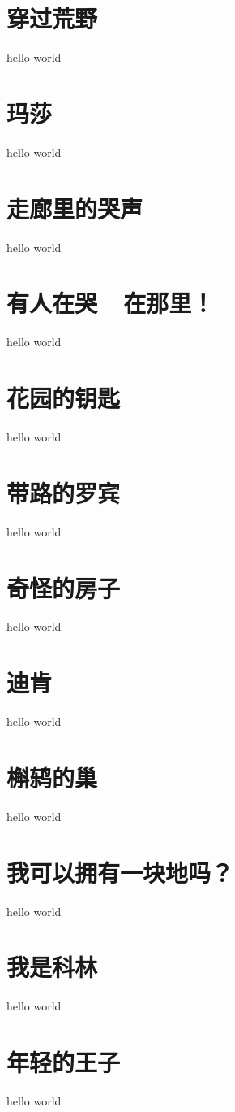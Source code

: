 \documentclass[winfonts,UTF8,cs4size,a4paper,hyperref,fancyhdr,fntef]{ctexbook}
\begin{document}
\chapter{穿过荒野}
hello world

\chapter{玛莎}
hello world

\chapter{走廊里的哭声}
hello world

\chapter{有人在哭---在那里！}
hello world

\chapter{花园的钥匙}
hello world

\chapter{带路的罗宾}
hello world

\chapter{奇怪的房子}
hello world

\chapter{迪肯}
hello world

\chapter{槲鸫的巢}
hello world

\chapter{我可以拥有一块地吗？}
hello world

\chapter{我是科林}
hello world

\chapter{年轻的王子}
hello world
\end{document}
